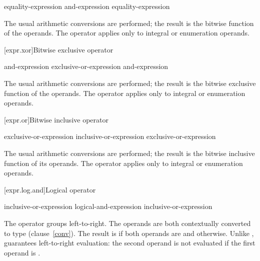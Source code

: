 \begin{bnf}
\br
    equality-expression\br
    and-expression \terminal{\&} equality-expression
\end{bnf}

\pnum
The usual arithmetic conversions are performed; the result is the
bitwise  function of the operands. The operator
applies only to integral or enumeration operands.

[expr.xor]{Bitwise exclusive  operator}%
%
%

\begin{bnf}
\br
    and-expression\br
    exclusive-or-expression \terminal{\^{}} and-expression
\end{bnf}

\pnum
The usual arithmetic conversions are performed; the result is the
bitwise exclusive  function of the operands. The
operator applies only to integral or enumeration operands.

[expr.or]{Bitwise inclusive  operator}%
%
%

\begin{bnf}
\br
    exclusive-or-expression\br
    inclusive-or-expression \terminal{|} exclusive-or-expression
\end{bnf}

\pnum
The usual arithmetic conversions are performed; the result is the
bitwise inclusive  function of its operands. The
operator applies only to integral or enumeration operands.

[expr.log.and]{Logical  operator}%
%
%
%

\begin{bnf}
\br
    inclusive-or-expression\br
    logical-and-expression \terminal{\&\&} inclusive-or-expression
\end{bnf}

\pnum
The \tcode{\&\&} operator groups left-to-right. The operands are both
contextually converted to type  (clause~\ref{conv}). The
result is  if both operands are  and
 otherwise. Unlike \tcode{\&}, \tcode{\&\&} guarantees
left-to-right evaluation: the second operand is not evaluated if the
first operand is .

